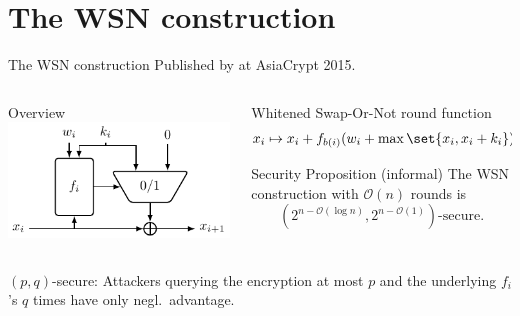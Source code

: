 \section{The WSN construction}
\begin{frame}{The WSN construction}
    \centering
    Published by \textcite{AC:Tessaro15} at AsiaCrypt 2015.
    \begin{columns}
        \begin{column}{0.49\textwidth}
            \begin{block}{Overview\vpPp}
                \centering
                \vspace*{13pt}
                \includegraphics{data/wsn}
                \vspace*{13pt}
            \end{block}
        \end{column}
        \begin{column}{0.49\textwidth}
            \begin{block}{Whitened Swap-Or-Not round function}
                \vspace*{-10pt}
                \begin{equation*}
                    x_i \mapsto x_i + f_{b(i)}(w_i + \max \set{x_i, x_i + k_i}) \cdot k_i
                \end{equation*}
            \end{block}

            \begin{block}{Security Proposition (informal)}
                The WSN construction with $\mathcal{O}(n)$ rounds is
                \begin{equation*}
                    (2^{n-\mathcal{O}(\log n)}, 2^{n-\mathcal{O}(1)})\text{-secure}.
                \end{equation*}
            \end{block}
        \end{column}
    \end{columns}
    \begingroup
        \vspace{10pt}
        \footnotesize
        $(p, q)$-secure: Attackers querying the encryption at most $p$ and the underlying $f_i$'s $q$ times have only negl.\ advantage.
    \endgroup
    \blfootnote{}
\end{frame}

